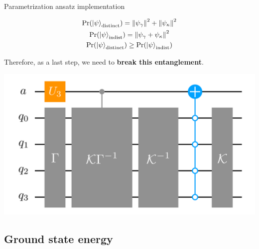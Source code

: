 \documentclass[9pt, handout, aspectratio=169]{beamer}	%
\begin{document}
\begin{frame}[allowframebreaks]{Parametrization ansatz implementation}
\begin{multicols}{2}
		\begin{gather*}
		  \text{Pr} \qty(\ket{\psi}_{\text{distinct}}) =
		    \norm{\psi_\gamma}^2 + \norm{\psi_\kappa}^2 \\
		  \text{Pr} \qty(\ket{\psi}_{\text{indist}}) =
		    \norm{\psi_\gamma + \psi_\kappa}^2 \\
		  \text{Pr} \qty(\ket{\psi}_{\text{distinct}}) \geq
		    \text{Pr} \qty(\ket{\psi}_{\text{indist}})
		\end{gather*}

		\columnbreak

		Therefore, as a last step, we need to \textbf{break this entanglement}.

		\begin{center}
			\includegraphics[width=.4\paperwidth]{Figures/NJL1-model-solving/ansatz-implementation-circuit}
		\end{center}

	\end{multicols}

\end{frame}


\subsection{Ground state energy}
\end{document}
